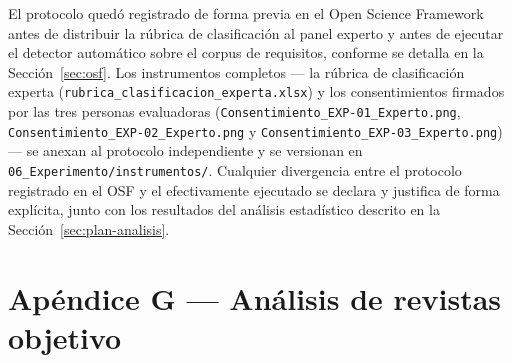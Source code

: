 \documentclass[journal,onecolumn]{IEEEtran}
\begin{document}
	El protocolo quedó registrado de forma previa en el Open Science Framework
	\cite{nosek2018} antes de distribuir la rúbrica de clasificación al panel
	experto y antes de ejecutar el detector automático sobre el corpus de
	requisitos, conforme se detalla en la Sección~\ref{sec:osf}. Los
	instrumentos completos --- la rúbrica de clasificación experta
	(\texttt{rubrica\_clasificacion\_experta.xlsx}) y los consentimientos
	firmados por las tres personas evaluadoras
	(\texttt{Consentimiento\_EXP-01\_Experto.png},
	\texttt{Consentimiento\_EXP-02\_Experto.png} y
	\texttt{Consentimiento\_EXP-03\_Experto.png}) --- se anexan al
	protocolo independiente y se versionan en
	\texttt{06\_Experimento/instrumentos/}. Cualquier divergencia entre el
	protocolo registrado en el OSF y el efectivamente ejecutado se declara y
	justifica de forma explícita, junto con los resultados
	del análisis estadístico descrito en la Sección~\ref{sec:plan-analisis}.
	
	\section*{Apéndice G --- Análisis de revistas objetivo}
	\label{ap:revistas}
	
\end{document}
